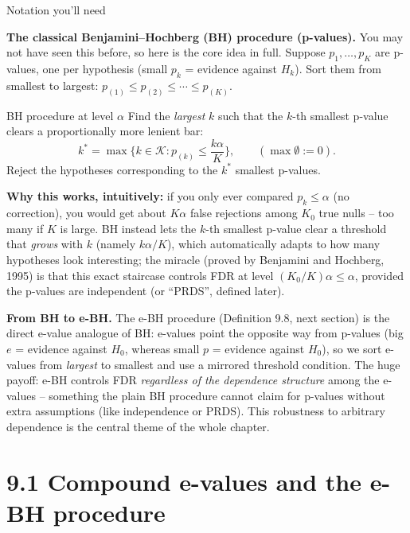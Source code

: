 \documentclass[aspectratio=169,10pt]{beamer}
\newcommand{\Kc}{\mathcal{K}}
\begin{document}
\begin{frame}[allowframebreaks]{Notation you'll need}
\framebreak

\textbf{The classical Benjamini--Hochberg (BH) procedure (p-values).} You may not have seen this before, so here is the core idea in full. Suppose $p_1,\dots,p_K$ are p-values, one per hypothesis (small $p_k$ = evidence against $H_k$). Sort them from smallest to largest: $p_{(1)} \le p_{(2)} \le \cdots \le p_{(K)}$.

\begin{block}{BH procedure at level $\alpha$}
Find the \emph{largest} $k$ such that the $k$-th smallest p-value clears a proportionally more lenient bar:
\[
k^\ast = \max\Big\{ k \in \Kc : p_{(k)} \le \frac{k\alpha}{K} \Big\}, \qquad (\max \emptyset := 0).
\]
Reject the hypotheses corresponding to the $k^\ast$ smallest p-values.
\end{block}
\textbf{Why this works, intuitively:} if you only ever compared $p_k \le \alpha$ (no correction), you would get about $K\alpha$ false rejections among $K_0$ true nulls -- too many if $K$ is large. BH instead lets the $k$-th smallest p-value clear a threshold that \emph{grows} with $k$ (namely $k\alpha/K$), which automatically adapts to how many hypotheses look interesting; the miracle (proved by Benjamini and Hochberg, 1995) is that this exact staircase controls FDR at level $(K_0/K)\alpha \le \alpha$, provided the p-values are independent (or ``PRDS'', defined later).

\framebreak

\textbf{From BH to e-BH.} The e-BH procedure (Definition 9.8, next section) is the direct e-value analogue of BH: e-values point the opposite way from p-values (big $e$ = evidence against $H_0$, whereas small $p$ = evidence against $H_0$), so we sort e-values from \emph{largest} to smallest and use a mirrored threshold condition. The huge payoff: e-BH controls FDR \emph{regardless of the dependence structure} among the e-values -- something the plain BH procedure cannot claim for p-values without extra assumptions (like independence or PRDS). This robustness to arbitrary dependence is the central theme of the whole chapter.

\end{frame}

\section{9.1 Compound e-values and the e-BH procedure}
\end{document}

